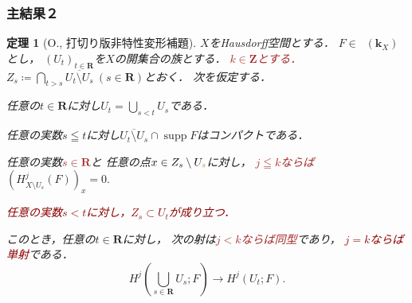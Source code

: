 \documentclass[dvipdfmx,10pt,aspectratio=169,leqno]{beamer}%
\newcommand{\zz}{\mathbf{Z}}
\newcommand{\rr}{\mathbf{R}}
\newcommand{\kk}{\mathbf{k}}
\numberwithin{equation}{subsection}
\newcommand{\supp}{\mathop{\mathrm{supp}}\nolimits}
\newcommand{\Dompl}{\mathop{\mathsf{D}^\mathrm{+}}\nolimits}
\theoremstyle{mystyle}
\newtheorem{THM}[AXM]{定理}
\begin{document}
\begin{frame}
    \frametitle{主結果２}
  \begin{THM}[O., 打切り版非特性変形補題]
    \(X\)をHausdorff空間とする．
    \(F\in\Dompl(\kk_X)\)とし，
    \(\left(U_{t}\right)_{t\in\rr}\)を\(X\)の開集合の族とする．
    \textcolor{brown}{\(k\in\zz\)とする．}
    \(
      Z_{s}\coloneqq \bigcap_{t>s}\overline{U_t\setminus U_s}\ (s\in\rr)
    \)とおく．
    次を仮定する．%
    \begin{enumerate}[(i)]
      \setlength{\leftskip}{10pt}
      \item %
      任意の\(t\in\rr\)に対し\(U_{t}=\bigcup_{s<t}U_{s}\)である．
      \item %
      任意の実数\(s\leqq t\)に対し\(
        \overline{U_{t}\setminus U_{s}}\cap \supp{F}
      \)はコンパクトである．
      \item %
      任意の実数\textcolor{brown}{\(s\in\rr\)}と
      任意の点\(x\in Z_{s}\setminus U_{\textcolor{brown}{s}}\)に対し，
      \textcolor{brown}{\(j\leqq k\)ならば}
      \(
        (H^{j}_{X\setminus U_{s}}(F))_{x}=0. 
      \)
      \textcolor{darkred}{\item \label{item:t-nonchar4} 
      任意の実数\(s< t\)に対し，\(Z_s\subset U_{t}\)が成り立つ．}
    \end{enumerate}
    このとき，任意の\(t\in\rr\)に対し，
    次の射は\textcolor{brown}{\(j<k\)ならば同型}であり，
    \textcolor{darkred}{\(j=k\)ならば単射}である．
    \[
      H^{j}\left(\bigcup_{s\in\rr}U_{s};F\right)
      \to
      H^{j}\left(U_{t};F\right).
    \]
  \end{THM}
\end{frame}
\end{document}
